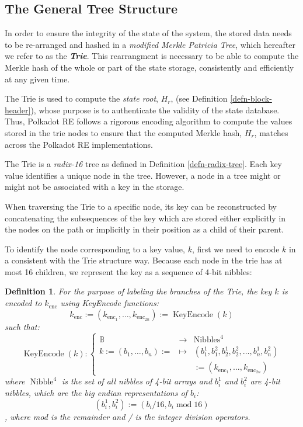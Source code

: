 \documentclass{book}
\newcommand{\assign}{:=}
\newcommand{\nosymbol}{}
\newcommand{\tmem}[1]{{\em #1\/}}
\newcommand{\tmop}[1]{\ensuremath{\operatorname{#1}}}
\newcommand{\tmstrong}[1]{\textbf{#1}}
\newcommand{\tmtextbf}[1]{{\bfseries{#1}}}
\newcommand{\tmtextit}[1]{{\itshape{#1}}}
\newtheorem{definition}{Definition}
\providecommand{\nosymbol}{}
\providecommand{\tmem}[1]{\tmtextit{#1}}
\providecommand{\tmop}[1]{\ensuremath{\mathrm{#1}}}
\providecommand{\tmstrong}[1]{\tmtextbf{#1}}
\providecommand{\tmtextbf}[1]{\tmtextbf{#1}}
\providecommand{\tmtextit}[1]{\tmtextit{#1}}
\newtheorem{definition}{Definition}
\begin{document}
\subsection{The General Tree Structure}

In order to ensure the integrity of the state of the system, the stored data
needs to be re-arranged and hashed in a {\tmem{modified Merkle Patricia
Tree}}, which hereafter we refer to as the {\tmem{{\tmstrong{Trie}}}}. This
rearrangment is necessary to be able to compute the Merkle hash of the whole
or part of the state storage, consistently and efficiently at any given time.

The Trie is used to compute the {\tmem{state root}}, $H_r$, (see Definition
\ref{defn-block-header}), whose purpose is to authenticate the validity of the
state database. Thus, Polkadot RE follows a rigorous encoding algorithm to
compute the values stored in the trie nodes to ensure that the computed Merkle
hash, $H_r$, matches across the Polkadot RE implementations.

The Trie is a {\tmem{radix-16}} tree as defined in Definition
\ref{defn-radix-tree}. Each key value identifies a unique node in the tree.
However, a node in a tree might or might not be associated with a key in the
storage.

When traversing the Trie to a specific node, its key can be reconstructed by
concatenating the subsequences of the key which are stored either explicitly
in the nodes on the path or implicitly in their position as a child of their
parent.

To identify the node corresponding to a key value, $k$, first we need to
encode $k$ in a consistent with the Trie structure way. Because each node in
the trie has at most 16 children, we represent the key as a sequence of 4-bit
nibbles:

\begin{definition}
  For the purpose of labeling the branches of the Trie, the key $k$ is encoded
  to $k_{\tmop{enc}}$ using KeyEncode functions:
  \begin{equation}
    k_{\tmop{enc}} \assign (k_{\tmop{enc}_1}, \ldots, k_{\tmop{enc}_{2 n}})
    \assign \tmop{KeyEncode} (k) \label{key-encode-in-trie}
  \end{equation}
  such that:
  \[ \tmop{KeyEncode} (k) : \left\{ \begin{array}{lll}
       \mathbb{B}^{\nosymbol} & \rightarrow & \tmop{Nibbles}^4\\
       k \assign (b_1, \ldots, b_n) \assign & \mapsto & (b^1_1, b^2_1, b_2^1,
       b^2_2, \ldots, b^1_n, b^2_n)\\
       &  & \assign (k_{\tmop{enc}_1}, \ldots, k_{\tmop{enc}_{2 n}})
     \end{array} \right. \]
  where $\tmop{Nibble}^4$ is the set of all nibbles of 4-bit arrays and
  $b^1_i$ and $b^2_i$ are 4-bit nibbles, which are the big endian
  representations of $b_i$:
  \[ (b^1_i, b^2_i) \assign (b_i / 16, b_i \tmop{mod} 16) \]
  , where mod is the remainder and / is the integer division operators.
\end{definition}
\end{document}
